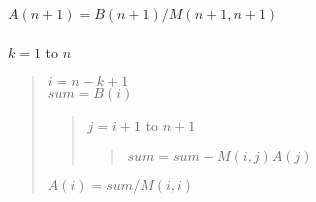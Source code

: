 \documentclass[10pt]{article}
\begin{document}
\noindent $A\left(n+1\right) = B\left(n+1\right)/M\left(n+1,n+1\right)$ \\
 \\
 $k = 1$ to $n$
\begin{quote}
\noindent $i = n - k + 1$ \\
\noindent $sum = B\left(i\right)$
\begin{quote}
 $j = i+1$ to $n+1$
\begin{quote}
\noindent $sum = sum - M\left(i,j\right) A\left(j\right)$
\end{quote}
\end{quote}
\noindent $A\left(i\right) = sum/M\left(i,i\right)$
\end{quote}
\end{document}

